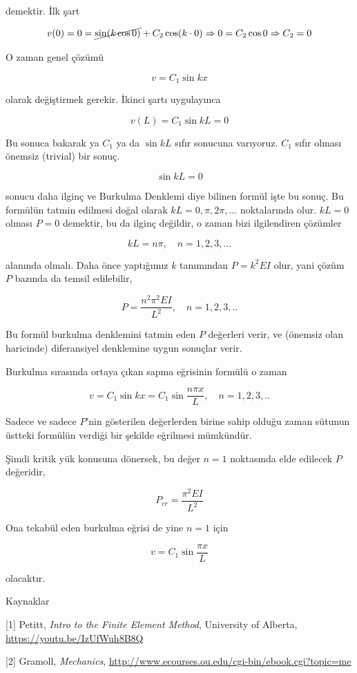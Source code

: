 \documentclass[12pt,fleqn]{article}\usepackage{../../common}
\begin{document}
demektir. İlk şart

$$
v(0) = 0 = \cancel{\sin (k \cos 0)} + C_2 \cos (k \cdot 0) \Rightarrow
0 = C_2 \cos 0 \Rightarrow
C_2 = 0
$$

O zaman genel çözümü

$$
v = C_1 \sin kx 
$$

olarak değiştirmek gerekir. İkinci şartı uygulayınca 

$$
v(L) = C_1 \sin kL = 0
$$

Bu sonuca bakarak ya $C_1$ ya da $\sin kL$ sıfır sonucuna varıyoruz. $C_1$
sıfır olması önemsiz (trivial) bir sonuç.

$$
\sin kL = 0
$$

sonucu daha ilginç ve Burkulma Denklemi diye bilinen formül işte bu sonuç.  Bu
formülün tatmin edilmesi doğal olarak $kL = 0, \pi, 2\pi,...$ noktalarında olur.
$kL = 0$ olması $P=0$ demektir, bu da ilginç değildir, o zaman bizi ilgilendiren
çözümler

$$
kL = n\pi, \quad n=1,2,3,...
$$

alanında olmalı. Daha önce yaptığımız $k$ tanımından $P = k^2 EI$ olur,
yani çözüm $P$ bazında da temsil edilebilir,

$$
P = \frac{n^2 \pi^2 EI}{L^2}, \quad n=1,2,3,..
$$

Bu formül burkulma denklemini tatmin eden $P$ değerleri verir, ve (önemsiz olan
haricinde) diferansiyel denklemine uygun sonuçlar verir.

Burkulma sırasında ortaya çıkan sapma eğrisinin formülü o zaman 

$$
v = C_1 \sin kx  = C_1 \sin \frac{n\pi x}{L}, \quad n=1,2,3,..
$$

Sadece ve sadece $P$'nin gösterilen değerlerden birine sahip olduğu zaman
sütunun üstteki formülün verdiği bir şekilde eğrilmesi mümkündür. 

Şimdi kritik yük konusuna dönersek, bu değer $n=1$ noktasında elde edilecek $P$
değeridir,

$$
P_{cr} = \frac{\pi^2 EI}{L^2}
$$

Ona tekabül eden burkulma eğrisi de yine $n=1$ için

$$
v = C_1 \sin \frac{\pi x}{L}
$$

olacaktır.

Kaynaklar

[1] Petitt, {\em Intro to the Finite Element Method}, University of Alberta,
    \url{https://youtu.be/IzUfWuh8B8Q}

[2] Gramoll, {\em Mechanics},
    \url{http://www.ecourses.ou.edu/cgi-bin/ebook.cgi?topic=me}
\end{document}
